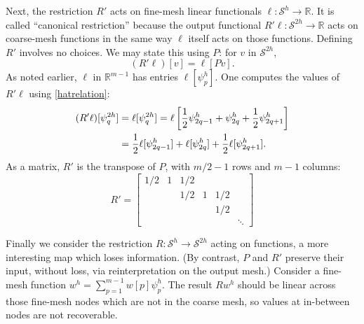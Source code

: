 \documentclass[letterpaper,final,12pt,reqno]{amsart}
\newcommand{\RR}{\mathbb{R}}
\begin{document}
Next, the restriction $R'$ acts on fine-mesh linear functionals $\ell:\mathcal{S}^h \to \RR$.  It is called ``canonical restriction'' \cite{GraeserKornhuber2009} because the output functional $R'\ell:\mathcal{S}^{2h}\to \RR$ acts on coarse-mesh functions in the same way $\ell$ itself acts on those functions.  Defining $R'$ involves no choices.  We may state this using $P$: for $v$ in $\mathcal{S}^{2h}$,
\begin{equation}
  (R'\ell)[v] = \ell[Pv].  \label{rprimedefinition}
\end{equation}
As noted earlier, $\ell$ in $\RR^{m-1}$ has entries $\ell[\psi_p^h]$.  One computes the values of $R'\ell$ using \eqref{hatrelation}:
\begin{align}
  (R'\ell)[\psi_q^{2h}] &= \ell[\psi_q^{2h}] = \ell\left[\frac{1}{2} \psi_{2q-1}^h + \psi_{2q}^h + \frac{1}{2} \psi_{2q+1}^h\right]  \label{rprimeformula} \\
      &= \frac{1}{2} \ell[\psi_{2q-1}^h] + \ell[\psi_{2q}^h] + \frac{1}{2} \ell[\psi_{2q+1}^h].  \notag
\end{align}
As a matrix, $R'$ is the transpose of $P$, with $m/2-1$ rows and $m-1$ columns:
\begin{equation}
R' = \begin{bmatrix}
1/2 & 1 & 1/2 &   &     & \\
    &   & 1/2 & 1 & 1/2 & \\
    &   &     &   & 1/2 & \\
    &   &     &   &     & \ddots
\end{bmatrix} \label{rprimematrix}
\end{equation}

Finally we consider the restriction $R:\mathcal{S}^h\to\mathcal{S}^{2h}$ acting on functions, a more interesting map which loses information.  (By contrast, $P$ and $R'$ preserve their input, without loss, via reinterpretation on the output mesh.)  Consider a fine-mesh function $w^h = \sum_{p=1}^{m-1} w[p] \psi_p^{h}$.  The result $R w^h$ should be linear across those fine-mesh nodes which are not in the coarse mesh, so values at in-between nodes are not recoverable.
\end{document}
